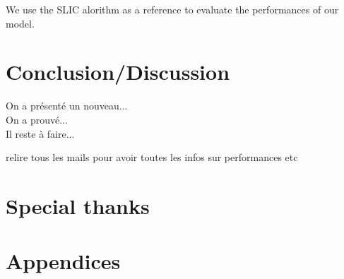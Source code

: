 \documentclass{article}
\begin{document}
        \noindent We use the SLIC alorithm as a reference to evaluate the performances of our model.



\section{Conclusion/Discussion}
On a présenté un nouveau...\\
On a prouvé...\\
Il reste à faire...

relire tous les mails pour avoir toutes les infos sur performances etc

\section*{Special thanks}




\newpage

\section*{Appendices}
\end{document}
